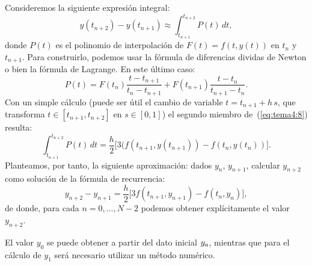 \begin{example}
  \label{sec:AB-dos-pasos}
  Consideremos la siguiente expresión integral:
  \begin{equation}
   \label{eq:tema4:8} 
   y(t_{n+2})-y(t_{n+1}) \approx \int_{t_{n+1}}^{t_{n+2}} P(t)\,dt,
  \end{equation}
  donde $P(t)$ es el polinomio de interpolación de $F(t)=f(t,y(t))$ en
  $t_n$ y $t_{n+1}$. Para construirlo, podemos usar la fórmula de
  diferencias dividas de Newton o bien la fórmula de Lagrange. En este
  último caso:
  \begin{equation*}
   P(t)=F(t_n)\frac{t-t_{n+1}}{t_n-t_{n+1}} +
   F(t_{n+1})\frac{t-t_{n}}{t_{n+1}-t_{n}}.
  \end{equation*}
  Con un simple cálculo (puede ser útil el cambio de variable $t =
  t_{n+1}+h\,s$, que transforma $t\in [t_{n+1},t_{n+2}]$ en $s\in [0,1]$)
  el segundo miembro de~(\ref{eq:tema4:8}) resulta:
  \begin{equation*}
  \int_{t_{n+1}}^{t_{n+2}} P(t)\,dt = \frac{h}{2} \big[
  3(f(t_{n+1},y(t_{n+1})) - f(t_{n},y(t_{n})) \big].
  \end{equation*}
  Planteamos, por tanto, la siguiente aproximación: dados $y_n$,
  $y_{n+1}$, calcular $y_{n+2}$ como solución de la
  fórmula de recurrencia:
  \begin{equation*}
    y_{n+2}-y_{n+1} = \frac{h}{2} \big[
  3f(t_{n+1},y_{n+1}) - f(t_{n},y_{n}) \big],
  \end{equation*}
  de donde, para cada $n=0,...,N-2$ podemos obtener explícitamente el
  valor $y_{n+2}$.
  
  El valor $y_0$ se puede obtener a partir del dato inicial ${y_a}$,
  mientras que para el cálculo de $y_1$ será necesario utilizar un
  método numérico.
\end{example}

